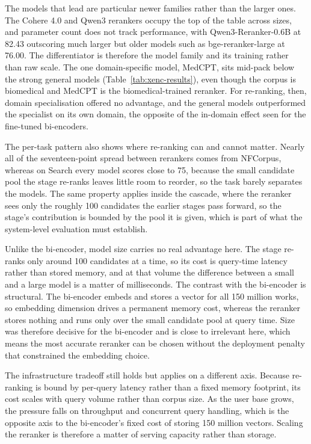 The models that lead are particular newer families rather than the larger ones. The Cohere 4.0 and Qwen3 rerankers occupy the top of the table across sizes, and parameter count does not track performance, with Qwen3-Reranker-0.6B at 82.43 outscoring much larger but older models such as bge-reranker-large at 76.00. The differentiator is therefore the model family and its training rather than raw scale. The one domain-specific model, MedCPT, sits mid-pack below the strong general models (Table~\ref{tab:xenc-results}), even though the corpus is biomedical and MedCPT is the biomedical-trained reranker. For re-ranking, then, domain specialisation offered no advantage, and the general models outperformed the specialist on its own domain, the opposite of the in-domain effect seen for the fine-tuned bi-encoders.

The per-task pattern also shows where re-ranking can and cannot matter. Nearly all of the seventeen-point spread between rerankers comes from NFCorpus, whereas on Search every model scores close to 75, because the small candidate pool the stage re-ranks leaves little room to reorder, so the task barely separates the models. The same property applies inside the cascade, where the reranker sees only the roughly 100 candidates the earlier stages pass forward, so the stage's contribution is bounded by the pool it is given, which is part of what the system-level evaluation must establish.

Unlike the bi-encoder, model size carries no real advantage here. The stage re-ranks only around 100 candidates at a time, so its cost is query-time latency rather than stored memory, and at that volume the difference between a small and a large model is a matter of milliseconds. The contrast with the bi-encoder is structural. The bi-encoder embeds and stores a vector for all 150 million works, so embedding dimension drives a permanent memory cost, whereas the reranker stores nothing and runs only over the small candidate pool at query time. Size was therefore decisive for the bi-encoder and is close to irrelevant here, which means the most accurate reranker can be chosen without the deployment penalty that constrained the embedding choice.

The infrastructure tradeoff still holds but applies on a different axis. Because re-ranking is bound by per-query latency rather than a fixed memory footprint, its cost scales with query volume rather than corpus size. As the user base grows, the pressure falls on throughput and concurrent query handling, which is the opposite axis to the bi-encoder's fixed cost of storing 150 million vectors. Scaling the reranker is therefore a matter of serving capacity rather than storage.

